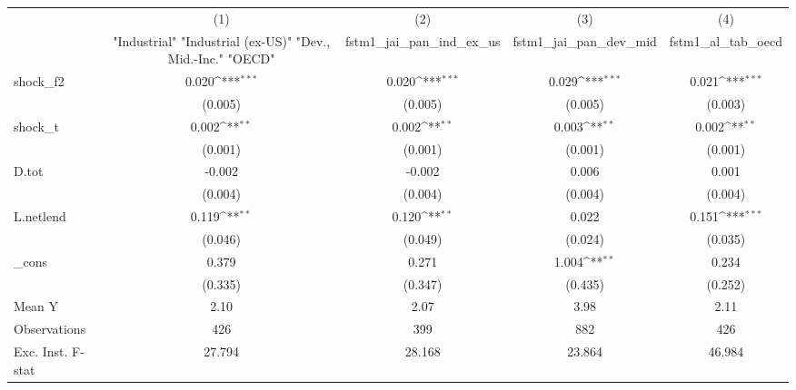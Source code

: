 {
\def\sym#1{\ifmmode^{#1}\else\(^{#1}\)\fi}
\begin{tabular}{l*{4}{c}}
\toprule
            &\multicolumn{1}{c}{(1)}&\multicolumn{1}{c}{(2)}&\multicolumn{1}{c}{(3)}&\multicolumn{1}{c}{(4)}\\
            &\multicolumn{1}{c}{ "Industrial" "Industrial (ex-US)" "Dev., Mid.-Inc." "OECD" }&\multicolumn{1}{c}{fstm1\_jai\_pan\_ind\_ex\_us}&\multicolumn{1}{c}{fstm1\_jai\_pan\_dev\_mid}&\multicolumn{1}{c}{fstm1\_al\_tab\_oecd}\\
\midrule
shock\_f2    &       0.020\sym{***}&       0.020\sym{***}&       0.029\sym{***}&       0.021\sym{***}\\
            &     (0.005)         &     (0.005)         &     (0.005)         &     (0.003)         \\
\addlinespace
shock\_t     &       0.002\sym{**} &       0.002\sym{**} &       0.003\sym{**} &       0.002\sym{**} \\
            &     (0.001)         &     (0.001)         &     (0.001)         &     (0.001)         \\
\addlinespace
D.tot       &      -0.002         &      -0.002         &       0.006         &       0.001         \\
            &     (0.004)         &     (0.004)         &     (0.004)         &     (0.004)         \\
\addlinespace
L.netlend   &       0.119\sym{**} &       0.120\sym{**} &       0.022         &       0.151\sym{***}\\
            &     (0.046)         &     (0.049)         &     (0.024)         &     (0.035)         \\
\addlinespace
\_cons      &       0.379         &       0.271         &       1.004\sym{**} &       0.234         \\
            &     (0.335)         &     (0.347)         &     (0.435)         &     (0.252)         \\
\midrule
Mean Y      &        2.10         &        2.07         &        3.98         &        2.11         \\
Observations&         426         &         399         &         882         &         426         \\
Exc. Inst. F-stat&      27.794         &      28.168         &      23.864         &      46.984         \\
\bottomrule
\end{tabular}
}
